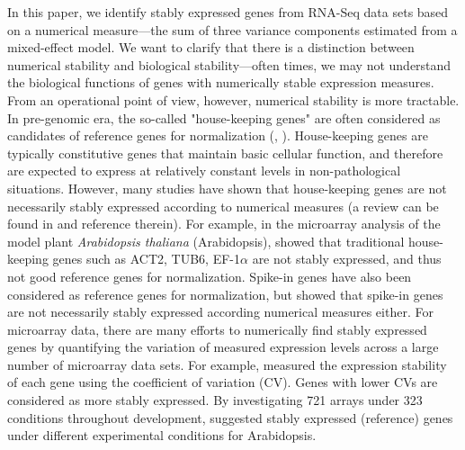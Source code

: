 \documentclass[11pt, a4paper]{article}
\begin{document}
In this paper, we identify stably expressed genes from RNA-Seq data sets based
on a numerical measure---the sum of three variance components estimated from a
mixed-effect model.  We want to clarify that there is a distinction between
numerical stability and biological stability---often times, we may not
understand the biological functions of genes with numerically stable
expression measures.  From an operational point of view, however, numerical
stability is more tractable. In pre-genomic era, the so-called "house-keeping
genes" are often considered as candidates of reference genes for
normalization (\cite{bustin2002quantification},
\cite{andersen2004normalization}). House-keeping
genes are typically constitutive genes that
maintain basic cellular function, and therefore are expected to express at
relatively constant levels in non-pathological situations.  However, many
studies have shown that house-keeping
genes are not necessarily stably expressed according to
numerical measures (a review can be found in \cite{huggett2005real} and
reference therein).  For example, in the microarray analysis of the model
plant \textit{Arabidopsis thaliana} (Arabidopsis), \cite{czechowski2005genome}
showed that traditional house-keeping
genes such as ACT2, TUB6, EF-1$\alpha$ are not stably
expressed, and thus not good reference genes for normalization.  Spike-in
genes have also been considered as reference genes for normalization, but
\cite{risso2014nat} showed that spike-in genes are not necessarily stably
expressed according numerical measures either.  
For microarray data, there are many efforts to numerically find stably
expressed genes by quantifying the variation of measured expression levels
across a large number of microarray data sets.  For example,
\cite{czechowski2005genome} measured the expression stability of each gene
using the coefficient of variation (CV). Genes with lower CVs are considered
as more stably expressed.  By investigating 721 arrays under 323 conditions
throughout development, \cite{czechowski2005genome} suggested stably expressed
(reference) genes under different experimental conditions for Arabidopsis.
\end{document}
